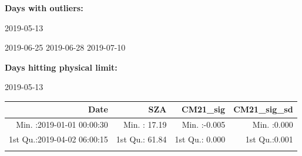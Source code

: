 \documentclass[
  10pt,
  a4paper,oneside]{article}
\begin{document}
\normalsize

\textbf{Days with outliers:}

2019-05-13

2019-06-25 2019-06-28 2019-07-10

\textbf{Days hitting physical limit:}

2019-05-13

\footnotesize

\begin{longtable}[]{@{}rrrr@{}}
\toprule
\begin{minipage}[b]{0.33\columnwidth}\raggedleft
Date\strut
\end{minipage} & \begin{minipage}[b]{0.19\columnwidth}\raggedleft
SZA\strut
\end{minipage} & \begin{minipage}[b]{0.19\columnwidth}\raggedleft
CM21\_sig\strut
\end{minipage} & \begin{minipage}[b]{0.19\columnwidth}\raggedleft
CM21\_sig\_sd\strut
\end{minipage}\tabularnewline
\midrule
\endhead
\begin{minipage}[t]{0.33\columnwidth}\raggedleft
Min. :2019-01-01 00:00:30\strut
\end{minipage} & \begin{minipage}[t]{0.19\columnwidth}\raggedleft
Min. : 17.19\strut
\end{minipage} & \begin{minipage}[t]{0.19\columnwidth}\raggedleft
Min. :-0.005\strut
\end{minipage} & \begin{minipage}[t]{0.19\columnwidth}\raggedleft
Min. :0.000\strut
\end{minipage}\tabularnewline
\begin{minipage}[t]{0.33\columnwidth}\raggedleft
1st Qu.:2019-04-02 06:00:15\strut
\end{minipage} & \begin{minipage}[t]{0.19\columnwidth}\raggedleft
1st Qu.: 61.84\strut
\end{minipage} & \begin{minipage}[t]{0.19\columnwidth}\raggedleft
1st Qu.: 0.000\strut
\end{minipage} & \begin{minipage}[t]{0.19\columnwidth}\raggedleft
1st Qu.:0.001\strut
\end{minipage}\tabularnewline
\begin{minipage}[t]{0.33\columnwidth}\raggedleft

\end{minipage}
\end{longtable}
\end{document}
